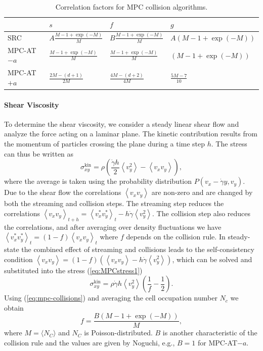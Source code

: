 \documentclass[8.5pt,twoside,twocolumn]{article}
\begin{document}
\begin{table}\centering
\begin{tabular}{llll}
\hline
  & $s$ & $f$ & $g$ \\
\hline
  SRC        & $A\frac{M-1+\exp(-M)}{M}$ & $B\frac{M-1+\exp(-M)}{M}$ & $A\left(M-1+\exp(-M)\right)$ \\
  MPC-AT$-a$ & $\frac{M-1+\exp(-M)}{M}$  & $\frac{M-1+\exp(-M)}{M}$ & $\left(M-1+\exp(-M)\right)$\\
  MPC-AT$+a$ & $\frac{2M-(d+1)}{2M}$     & $\frac{4M-(d+2)}{4M}$ & $\frac{5M-7}{10}$ \\
\hline
\end{tabular}
\caption{Correlation factors for MPC collision algorithms.}
\end{table}

\paragraph{Shear Viscosity}

To determine the shear viscosity, we consider a steady linear shear flow and analyze the force acting on a laminar plane. 
%
The kinetic contribution results from the momentum of particles crossing the plane during a time step $h$. The stress can thus be written as\cite{Kikuchi:2003,Noguchi:2008}
%
\begin{equation}\label{eq:MPCstress1}
\sigma^\text{kin}_{xy} = \rho \left( \frac{\dot{\gamma} h}{2} \left\langle v_y^2 \right\rangle - \left\langle v_x v_y \right\rangle \right) ,
\end{equation}
%
where the average is taken using the probability distribution $P(v_x-\dot{\gamma}y,v_y)$. Due to the shear flow the correlations $\left\langle v_xv_y \right\rangle$ are non-zero and are changed by both the streaming and collision steps.
%
The streaming step reduces the correlations $\left\langle v_xv_y \right\rangle_{t+h} = \left\langle v_x^*v_y^* \right\rangle_t - h \dot{\gamma} \left\langle v_y^2 \right\rangle$.
%
The collision step also reduces the correlations, and after averaging over density fluctuations we have $\left\langle v_x^*v_y^* \right\rangle_t = (1-f) \left\langle v_xv_y \right\rangle_t$ where $f$ depends on the collision rule. In steady-state the combined effect of streaming and collisions leads to the self-consistency condition $\left\langle v_xv_y \right\rangle = (1-f) \left( \left\langle v_xv_y \right\rangle - h \dot{\gamma} \left\langle v_y^2 \right\rangle \right)$, which can be solved and substituted into the stress (\ref{eq:MPCstress1})
%
\begin{equation}
\sigma^\text{kin}_{xy} = \rho \dot{\gamma} h \left\langle v_y^2 \right\rangle \left( \frac{1}{f} -\frac{1}{2} \right) .
\end{equation}
%
Using (\ref{eq:mpc-collisions}) and averaging the cell occupation number $N_c$ we obtain
%
\begin{equation}
f = \frac{B\left(M-1+\exp(-M)\right)}{M} ,
\end{equation}
%
where $M=\langle N_C \rangle$ and $N_C$ is Poisson-distributed. $B$ is another characteristic of the collision rule and the values are given by Noguchi\cite{Noguchi:2008}, e.g., $B=1$ for MPC-AT$-a$.
\end{document}
